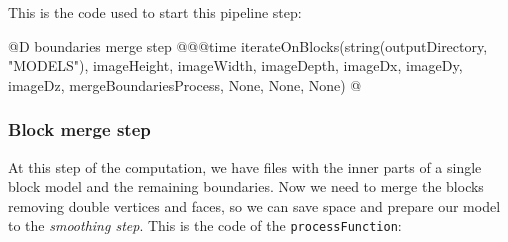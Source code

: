 \documentclass[11pt,oneside]{article}	%
\begin{document}
This is the code used to start this pipeline step:

@D boundaries merge step
@{@@time iterateOnBlocks(string(outputDirectory, "MODELS"),
                  imageHeight, imageWidth, imageDepth,
                  imageDx, imageDy, imageDz,
                  mergeBoundariesProcess, None,
                  None, None) @}
                
\subsubsection{Block merge step}\label{sec:blockMergeStep}

At this step of the computation, we have files with the inner parts of a single block model and the remaining boundaries. Now we need to merge the blocks removing double vertices and faces, so we can save space and prepare our model to the \textit{smoothing step}. This is the code of the \texttt{processFunction}:
\end{document}
